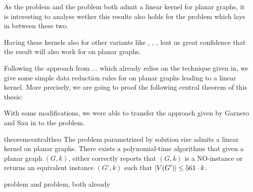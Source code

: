 \noindent As the \dom problem and the \tdom problem both admit a linear kernel for planar graphs, it is interesting to analyse wether this results also holds for the \sdom problem which lays in between these two. 

Having these kernels also for other variants like \eddom, \efdom, \cdom, \rbdom lent us great confidence that the result will also work for \sdom on planar graphs.


Following the approach from ... which already relies on the technique given in, we give some simple data reduction rules for \sdom on planar graphs leading to a linear kernel. More precisely, we are going to proof the following central theorem of this thesis:

With some modifications, we were able to transfer the approach given by Garnero and Sau in \cite{Garnero2018} to the \sdom problem.

\begin{restatable}[]{theorem}{centraltheo}\label{thm:central}
    The \sdom problem parametrized by solution size admits a linear kernel on planar graphs. There exists a polynomial-time algorithms that given a planar graph $(G, k)$, either correctly reports that $(G, k)$ is a NO-instance or returns an equivalent instance $(G', k)$ such that $\abs{V(G')} \leq 561 \cdot k$.
\end{restatable}

\dom problem and \tdom problem, both already 

